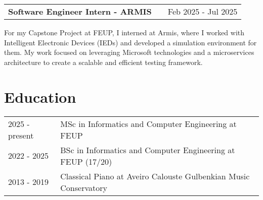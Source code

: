 \documentclass[a4paper,12pt]{article}
\makeatletter
\newenvironment{jobshort}[2]
    {
    \begin{tabularx}{\linewidth}{@{}l X r@{}}
    \textbf{#1} & \hfill &  #2 \\[3.75pt]
    \end{tabularx}
    }
    {
    }
\makeatother
\begin{document}
\begin{jobshort}{Software Engineer  Intern - ARMIS}{Feb 2025 - Jul 2025}
For my Capstone Project at FEUP, I interned at Armis, where I worked with Intelligent Electronic Devices (IEDs) and developed a simulation environment for them. My work focused on leveraging Microsoft technologies and a microservices architecture to create a scalable and efficient testing framework.
\end{jobshort}
  


\section{Education}
\begin{tabularx}{\linewidth}{@{}l X@{}}	
2025 - present & MSc in Informatics and Computer Engineering at FEUP \hfill \\

2022 - 2025 & BSc in Informatics and Computer Engineering at FEUP \hfill (17/20) \\ 

2013 - 2019 & Classical Piano at Aveiro Calouste Gulbenkian Music Conservatory \hfill \\ 

\end{tabularx}

\end{document}
